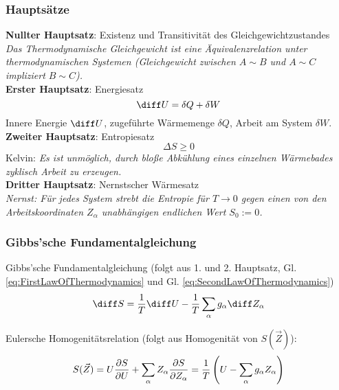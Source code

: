 \documentclass[11pt]{article}
\numberwithin{equation}{section}
\begin{document}
      \subsubsection{Hauptsätze}
        \textbf{Nullter Hauptsatz}: Existenz und Transitivität des Gleichgewichtzustandes\\
          \indent \emph{Das Thermodynamische Gleichgewicht ist eine Äquivalenzrelation unter thermodynamischen Systemen (Gleichgewicht zwischen $A \sim B$ und $A \sim C$ impliziert $ B \sim C$).} \\
        \textbf{Erster Hauptsatz}: Energiesatz\\
          \begin{equation}
            \label{eq:FirstLawOfThermodynamics}
            \diff U = \delta Q + \delta W
          \end{equation}
          \indent Innere Energie $\diff U$, zugeführte Wärmemenge $\delta Q$, Arbeit am System $\delta W$.\\
        \textbf{Zweiter Hauptsatz}: Entropiesatz\\
          \begin{equation}
            \label{eq:SecondLawOfThermodynamics}
            \Delta S  \ge 0
          \end{equation}
          \indent Kelvin: \emph{Es ist unmöglich, durch bloße Abkühlung eines einzelnen Wärmebades zyklisch Arbeit zu erzeugen. }\\
        \textbf{Dritter Hauptsatz}: Nernstscher Wärmesatz\\
          \indent \emph{Nernst: Für jedes System strebt die Entropie für $T \rightarrow 0$ gegen einen von den Arbeitskoordinaten $Z_\alpha$ unabhängigen endlichen Wert $S_0:=0$.}

      \subsubsection{Gibbs'sche Fundamentalgleichung}
        Gibbs'sche Fundamentalgleichung (folgt aus 1. und 2. Hauptsatz, Gl. \ref{eq:FirstLawOfThermodynamics} und Gl. \ref{eq:SecondLawOfThermodynamics})
        \begin{equation}
          \label{eq:GibbsFundamental}
          \diff S = \frac{1}{T} \diff U - \frac{1}{T} \sum_{\alpha} g_\alpha \diff Z_\alpha
        \end{equation}

        Eulersche Homogenitätsrelation (folgt aus Homogenität von $S(\vec{Z})$):
        \begin{equation}
          \label{eq:EulerHomogenity}
          S(\vec{Z}) = U\frac{\partial S}{\partial U} + \sum_\alpha Z_\alpha\frac{\partial S}{\partial Z_\alpha}
          = \frac{1}{T} \left( U-\sum_\alpha g_\alpha Z_\alpha \right)
        \end{equation}
\end{document}
